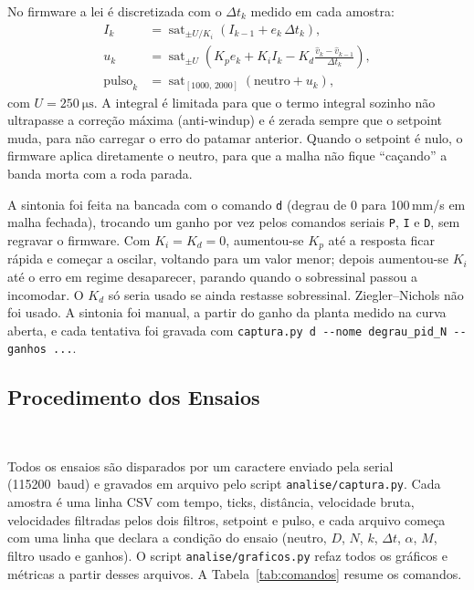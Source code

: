 \documentclass[12pt]{article}
\begin{document}
No firmware a lei é discretizada com o $\Delta t_k$ medido em cada amostra:
\begin{align}
    I_k &= \operatorname{sat}_{\pm U/K_i}\!\left(I_{k-1} + e_k\,\Delta t_k\right), \\
    u_k &= \operatorname{sat}_{\pm U}\!\left(K_p e_k + K_i I_k - K_d \frac{\hat v_k - \hat v_{k-1}}{\Delta t_k}\right), \\
    \text{pulso}_k &= \operatorname{sat}_{[1000,\,2000]}\left(\text{neutro} + u_k\right),
\end{align}
com $U = \SI{250}{\micro\second}$. A integral é limitada para que o termo integral sozinho não ultrapasse a correção máxima (anti-windup) e é zerada sempre que o setpoint muda, para não carregar o erro do patamar anterior. Quando o setpoint é nulo, o firmware aplica diretamente o neutro, para que a malha não fique ``caçando'' a banda morta com a roda parada.

A sintonia foi feita na bancada com o comando \texttt{d} (degrau de 0 para 100\,mm/s em malha fechada), trocando um ganho por vez pelos comandos seriais \texttt{P}, \texttt{I} e \texttt{D}, sem regravar o firmware. Com $K_i = K_d = 0$, aumentou-se $K_p$ até a resposta ficar rápida e começar a oscilar, voltando para um valor menor; depois aumentou-se $K_i$ até o erro em regime desaparecer, parando quando o sobressinal passou a incomodar. O $K_d$ só seria usado se ainda restasse sobressinal. Ziegler--Nichols não foi usado. A sintonia foi manual, a partir do ganho da planta medido na curva aberta, e cada tentativa foi gravada com \texttt{captura.py d -{}-nome degrau\_pid\_N -{}-ganhos ...}.

\subsection{Procedimento dos Ensaios}\

Todos os ensaios são disparados por um caractere enviado pela serial (115200~baud) e gravados em arquivo pelo script \texttt{analise/captura.py}. Cada amostra é uma linha CSV com tempo, ticks, distância, velocidade bruta, velocidades filtradas pelos dois filtros, setpoint e pulso, e cada arquivo começa com uma linha que declara a condição do ensaio (neutro, $D$, $N$, $k$, $\Delta t$, $\alpha$, $M$, filtro usado e ganhos). O script \texttt{analise/graficos.py} refaz todos os gráficos e métricas a partir desses arquivos. A Tabela~\ref{tab:comandos} resume os comandos.
\end{document}
